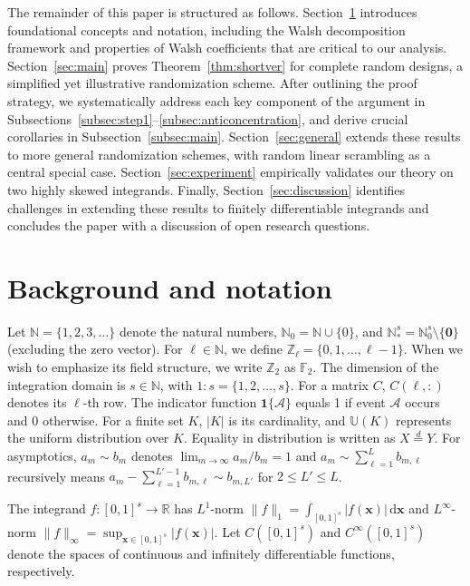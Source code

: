 \documentclass{article}
\theoremstyle{definition}
\renewcommand{\leq}{\leqslant}
\newcommand{\ints}{\mathbb{Z}}
\newcommand{\natu}{\mathbb{N}}
\newcommand{\bsx}{\boldsymbol{x}}
\newcommand{\bsone}{\boldsymbol{1}}
\newcommand{\rd}{\,\mathrm{d}}
\newcommand{\dunif}{\mathbb{U}}
\begin{document}
The remainder of this paper is structured as follows. Section~\ref{sec:back} introduces foundational concepts and notation, including the Walsh decomposition framework and properties of Walsh coefficients that are critical to our analysis. Section~\ref{sec:main} proves Theorem~\ref{thm:shortver} for complete random designs, a simplified yet illustrative randomization scheme. After outlining the proof strategy, we systematically address each key component of the argument in Subsections~\ref{subsec:step1}–\ref{subsec:anticoncentration}, and derive crucial corollaries in Subsection~\ref{subsec:main}. Section~\ref{sec:general} extends these results to more general randomization schemes, with random linear scrambling as a central special case. Section~\ref{sec:experiment} empirically validates our theory on two highly skewed integrands. Finally, Section~\ref{sec:discussion} identifies challenges in extending these results to finitely differentiable integrands and concludes the paper with a discussion of open research questions.

\section{Background and notation}\label{sec:back}

Let $\natu = \{1, 2, 3, \dots\}$ denote the natural numbers, $\natu_0 = \natu \cup \{0\}$, and $\natu_*^s = \natu_0^s \setminus \{\boldsymbol{0}\}$ (excluding the zero vector). For $\ell \in \natu$, we define $\ints_\ell = \{0, 1, \dots, \ell-1\}$. When we wish to emphasize its field structure, we write $\ints_2$ as $\mathbb{F}_2$.
 The dimension of the integration domain is $s \in \mathbb{N}$, with $1{:}s = \{1, 2, \dots, s\}$. For a matrix $C$, $C(\ell, :)$ denotes its $\ell$-th row. The indicator function $\bsone\{\mathcal{A}\}$ equals 1 if event $\mathcal{A}$ occurs and 0 otherwise. For a finite set $K$, $|K|$ is its cardinality, and $\dunif(K)$ represents the uniform distribution over $K$. Equality in distribution is written as $X\overset{d}{=} Y$. For asymptotics, $a_m\sim b_m$ denotes $\lim_{m\to\infty}a_m/b_m=1$ and $a_m\sim \sum_{\ell=1}^L b_{m,\ell}$ recursively means $a_m-\sum_{\ell=1}^{L'-1}b_{m,\ell}\sim b_{m,L'}$ for $2\leq L' \leq L$. 

The integrand $f: [0,1]^s \to \mathbb{R}$ has $L^1$-norm $\|f\|_1 = \int_{[0,1]^s} |f(\bsx)|  \rd\bsx$ and $L^\infty$-norm $\|f\|_\infty = \sup_{\bsx \in [0,1]^s} |f(\bsx)|$. Let $C([0,1]^s)$ and $C^\infty([0,1]^s)$ denote the spaces of continuous and infinitely differentiable functions, respectively.  
\end{document}
